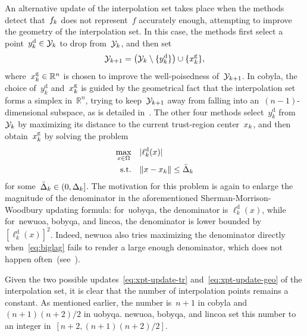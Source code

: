 \documentclass[
    smallextended,  %
    final,          %
]{svjour3}
\newcommand{\R}{\mathbb{R}}
\newcommand{\abs}[2][]{#1\lvert#2#1\rvert}
\newcommand{\drop}{{\text{d}}}
\newcommand{\fset}{\Omega}
\newcommand{\geo}{{\text{g}}}
\newcommand{\iter}[1][k]{x\ifthenelse{\equal{#1}{}}{}{_{#1}}}
\newcommand{\norm}[2][]{#1\lVert#2#1\rVert}
\newcommand{\objm}[1][k]{\obj\ifthenelse{\equal{#1}{}}{}{_{#1}}}
\newcommand{\obj}{f}
\newcommand{\radalt}[1][k]{\bar{\Delta}\ifthenelse{\equal{#1}{}}{}{_{#1}}}
\newcommand{\rad}[1][k]{\Delta\ifthenelse{\equal{#1}{}}{}{_{#1}}}
\newcommand{\set}[2][]{#1\{#2#1\}}
\newcommand{\st}{\text{s.t.}}
\newcommand{\xpt}[1][k]{\mathcal{Y}\ifthenelse{\equal{#1}{}}{}{_{#1}}}
\begin{document}
An alternative update of the interpolation set takes place
when the methods detect that~$\objm$ does not represent~$\obj$ accurately enough, attempting
to improve the geometry of the interpolation set.
In this case, the methods first select a point~$y_k^{\drop} \in \xpt$ to drop from~$\xpt$, and then set
\begin{equation}
    \label{eq:xpt-update-geo}
    \xpt[k + 1] = \big(\xpt \setminus \set{y_k^{\drop}}\big) \cup \set{\iter^{\geo}},
\end{equation}
where~$\iter^{\geo} \in \R^n$ is chosen to improve the well-poisedness of~$\xpt[k + 1]$.
In \gls{cobyla}, the choice of~$y_k^{\drop}$ and~$\iter^{\geo}$ is guided by the geometrical fact
that the interpolation set forms a simplex in~$\R^n$, trying to keep~$\xpt[k+1]$ away from falling into
an~$(n-1)$-dimensional subspace, as is detailed in~\cite[equations~(15)--(17)]{Powell_1994}.
The other four methods select~$y_k^{\drop}$ from~$\xpt$ by maximizing its distance to
the current trust-region center~$\iter$, and then obtain~$\iter^{\geo}$ by solving the problem
\begin{equation}
    \label{eq:biglag}
    \begin{split}
        \max_{x \in \fset}  & \quad \abs{\ell_k^{\drop}(x)}\\
        \st                 & \quad \norm{x - \iter} \le \radalt
    \end{split}
\end{equation}
for some~$\radalt \in (0, \rad]$.
The motivation for this problem is again to enlarge the magnitude of the
denominator in the aforementioned Sherman-Morrison-Woodbury updating formula:
for~\gls{uobyqa}, the denominator is $\ell_k^{\drop}(x)$, while for~\gls{newuoa}, \gls{bobyqa},
and \gls{lincoa}, the denominator is lower bounded by $[\ell_k^{\drop}(x)]^2$.
Indeed, \gls{newuoa} also tries maximizing the denominator directly when~\eqref{eq:biglag}
fails to render a large enough denominator, which does not happen often~(see~\cite[\S~6]{Powell_2006}).

Given the two possible updates~\eqref{eq:xpt-update-tr} and~\eqref{eq:xpt-update-geo} of the
interpolation set, it is clear that the number of interpolation points remains a constant.
As mentioned earlier, the number is~$n+1$ in \gls{cobyla} and~$(n+1)(n+2)/2$ in \gls{uobyqa}.
\gls{newuoa}, \gls{bobyqa}, and \gls{lincoa} set this number to an integer in~$[n+2, (n+1)(n+2)/2]$.
\end{document}
